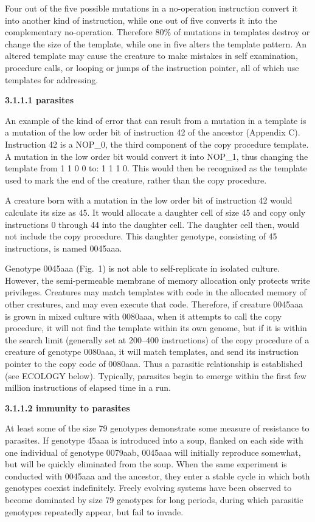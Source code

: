 Four out of the five possible mutations in a no-operation instruction convert
it into another kind of instruction, while one out of five converts it into
the complementary no-operation.  Therefore 80\% of mutations in templates
destroy or change the size of the template, while one in five alters the
template pattern.  An altered template may cause the creature to make
mistakes in self examination, procedure calls, or looping or jumps of the
instruction pointer, all of which use templates for addressing.

\LP
\bf 3.1.1.1 parasites\rm
\eLP

An example of the kind of error that can result from a mutation in a
template is a mutation of the low order bit of instruction 42 of the
ancestor (Appendix C).  Instruction 42 is a NOP\_0, the third component
of the copy procedure template.  A mutation in the low order bit would
convert it into NOP\_1, thus changing the template from 1 1 0 0 to: 1 1 1 0.
This would then be recognized as the template used to mark the end of the
creature, rather than the copy procedure.

A creature born with a mutation in the low order bit of instruction 42 would
calculate its size as 45.  It would allocate a daughter cell of size 45 and
copy only instructions 0 through 44 into the daughter cell.  The daughter
cell then, would not include the copy procedure.  This daughter genotype,
consisting of 45 instructions, is named 0045aaa.

Genotype 0045aaa (Fig.\ 1) is not able to self-replicate in isolated culture.
However, the semi-permeable membrane of memory allocation only protects write
privileges.  Creatures may match templates with code in the allocated memory
of other creatures, and may even execute that code.  Therefore, if creature
0045aaa is grown in mixed culture with 0080aaa, when it attempts to call the
copy procedure, it will not find the template within its own genome, but if
it is within the search limit (generally set at 200--400 instructions) of the
copy procedure of a creature of genotype 0080aaa, it will match templates, and
send its instruction pointer to the copy code of 0080aaa.  Thus a parasitic
relationship is established (see ECOLOGY below).  Typically, parasites begin
to emerge within the first few million instructions of elapsed time in a run.

\LP
\bf 3.1.1.2 immunity to parasites\rm
\eLP

At least some of the size 79 genotypes demonstrate some measure of
resistance to parasites.  If genotype 45aaa is introduced into a soup,
flanked on each side with one individual of genotype 0079aab, 0045aaa will
initially reproduce somewhat, but will be quickly eliminated from the soup.
When the same experiment is conducted with 0045aaa and the ancestor, they
enter a stable cycle in which both genotypes coexist indefinitely.  Freely
evolving systems have been observed to become dominated by size 79 genotypes
for long periods, during which parasitic genotypes repeatedly appear, but
fail to invade.

